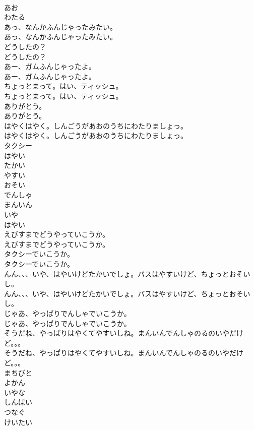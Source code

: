 \documentclass[8pt]{extreport}
\begin{document}
\begin{CJK}{UTF8}{min}
\\	あお
\\	わたる
\\	あっ、なんかふんじゃったみたい。
\\	あっ、なんかふんじゃったみたい。
\\	どうしたの？
\\	どうしたの？
\\	あー、ガムふんじゃったよ。
\\	あー、ガムふんじゃったよ。
\\	ちょっとまって。はい、ティッシュ。
\\	ちょっとまって。はい、ティッシュ。
\\	ありがとう。
\\	ありがとう。
\\	はやくはやく。しんごうがあおのうちにわたりましょっ。
\\	はやくはやく。しんごうがあおのうちにわたりましょっ。
\\	タクシー
\\	はやい
\\	たかい
\\	やすい
\\	おそい
\\	でんしゃ
\\	まんいん
\\	いや
\\	はやい
\\	えびすまでどうやっていこうか。
\\	えびすまでどうやっていこうか。
\\	タクシーでいこうか。
\\	タクシーでいこうか。
\\	んん、、、いや、はやいけどたかいでしょ。バスはやすいけど、ちょっとおそいし。
\\	んん、、、いや、はやいけどたかいでしょ。バスはやすいけど、ちょっとおそいし。
\\	じゃあ、やっぱりでんしゃでいこうか。
\\	じゃあ、やっぱりでんしゃでいこうか。
\\	そうだね、やっぱりはやくてやすいしね。まんいんでんしゃのるのいやだけど。。。
\\	そうだね、やっぱりはやくてやすいしね。まんいんでんしゃのるのいやだけど。。。
\\	まちびと
\\	よかん
\\	いやな
\\	しんぱい
\\	つなぐ
\\	けいたい

\end{CJK}
\end{document}
